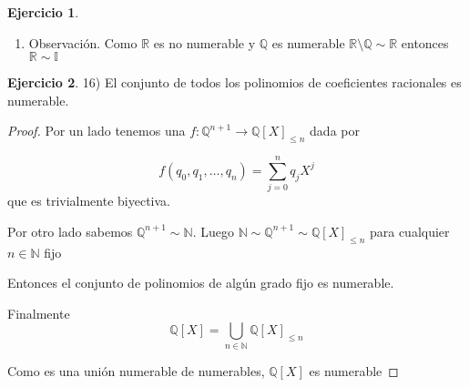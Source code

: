 \documentclass[12pt]{article}
\newcommand{\Q}{\mathbb{Q}}
\newcommand{\R}{\mathbb{R}}
\newcommand{\I}{\mathbb{I}}
\newcommand{\N}{\mathbb{N}}
\newcommand{\ra}{\rightarrow}
\theoremstyle{definition}
\newtheorem{ej}{Ejercicio}
\begin{document}
\begin{ej}
\begin{enumerate}
\begin{proof}
    Y por otro lado $f (((A \setminus B)\setminus C)^c) = B \cup C$

    Entonces $f(A\setminus B) = ((A\setminus B)\setminus C)) \cup (B\cup C) = A$


  \end{proof}
  \item Observación. Como $\R$ es no numerable y $\Q$ es numerable $\R \setminus \Q \sim \R$ entonces $\R \sim \I$
 
\end{enumerate}

\end{ej}

\begin{ej}
16) El conjunto de todos los polinomios de coeficientes racionales es numerable.

\begin{proof}

Por un lado tenemos una $f : \Q^{n+1} \ra \Q[X]_{\leq n}$ dada por

$$ f(q_{0},q_{1}, \dots , q_{n}) = \sum_{j = 0}^{n} q_{j}X^{j}$$ que es trivialmente biyectiva. 

Por otro lado sabemos $\Q^{n+1} \sim \N$. Luego $\N \sim \Q^{n+1} \sim \Q[X]_{\leq n}$ para cualquier $n \in \N$ fijo

Entonces el conjunto de polinomios de algún grado fijo es numerable.

Finalmente $$ \Q[X] = \bigcup_{n \in \N} \Q[X]_{\leq n}$$

Como es una unión numerable de numerables, $\Q[X]$ es numerable

\end{proof}

\end{ej}
\end{document}
